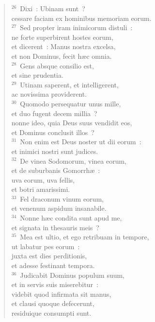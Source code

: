 \begin{verse}${}^{26}$~Dixi~: Ubinam sunt~?\\ cessare faciam ex hominibus memoriam eorum.\\
${}^{27}$~Sed propter iram inimicorum distuli~:\\ ne forte superbirent hostes eorum,\\ et dicerent~: Manus nostra excelsa,\\ et non Dominus, fecit h\ae c omnia.\\
${}^{28}$~Gens absque consilio est,\\ et sine prudentia.\\
${}^{29}$~Utinam saperent, et intelligerent,\\ ac novissima providerent.\\
${}^{30}$~Quomodo persequatur unus mille,\\ et duo fugent decem millia~?\\ nonne ideo, quia Deus suus vendidit eos,\\ et Dominus conclusit illos~?\\
${}^{31}$~Non enim est Deus noster ut dii eorum~:\\ et inimici nostri sunt judices.\\
${}^{32}$~De vinea Sodomorum, vinea eorum,\\ et de suburbanis Gomorrh\ae~:\\ uva eorum, uva fellis,\\ et botri amarissimi.\\
${}^{33}$~Fel draconum vinum eorum,\\ et venenum aspidum insanabile.\\
${}^{34}$~Nonne h\ae c condita sunt apud me,\\ et signata in thesauris meis~?\\
${}^{35}$~Mea est ultio, et ego retribuam in tempore,\\ ut labatur pes eorum~:\\ juxta est dies perditionis,\\ et adesse festinant tempora.\\
${}^{36}$~Judicabit Dominus populum suum,\\ et in servis suis miserebitur~:\\ videbit quod infirmata sit manus,\\ et clausi quoque defecerunt,\\ residuique consumpti sunt.\end{verse}


